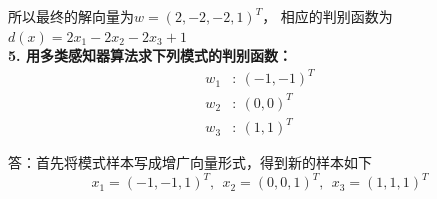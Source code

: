 \documentclass[a4paper, UTF8, 12pt]{ctexart}
\begin{document}
        所以最终的解向量为$w=(2,-2,-2,1)^T$，
        相应的判别函数为$d(x)=2x_1-2x_2-2x_3+1$ \\




    \textbf{5. 用多类感知器算法求下列模式的判别函数：}
    \begin{equation*}
        \begin{split}
            w_1  &: \ {\left(-1,-1\right)}^T \\
            w_2  &: \ {\left(0,0\right)}^T \\
            w_3  &: \ {\left(1,1\right)}^T
        \end{split}
    \end{equation*}

    答：首先将模式样本写成增广向量形式，得到新的样本如下
    \begin{equation*}
            x_1 = {\left(-1,-1,1\right)}^T ,\ \ 
            x_2 = {\left(0,0,1\right)}^T ,\ \  
            x_3 = {\left(1,1,1\right)}^T
    \end{equation*}
\end{document}
